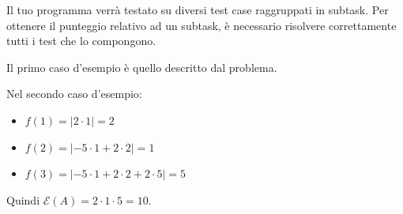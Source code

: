 \Scoring

Il tuo programma verrà testato su diversi test case raggruppati in subtask.
Per ottenere il punteggio relativo ad un subtask,
è necessario risolvere correttamente tutti i test che lo compongono.








\Examples

\begin{example}
\end{example}


\Explanation

Il primo caso d'esempio è quello descritto dal problema.

Nel secondo caso d'esempio:
\begin{itemize}
    \item $f(1) = |2\cdot 1| = 2$
    \item $f(2) = |-5\cdot 1 + 2\cdot 2| = 1$
    \item $f(3) = |-5\cdot 1 + 2\cdot 2 + 2\cdot 5| = 5$
\end{itemize}
Quindi $\mathcal{E}(A) = 2 \cdot 1 \cdot 5 = 10$.

